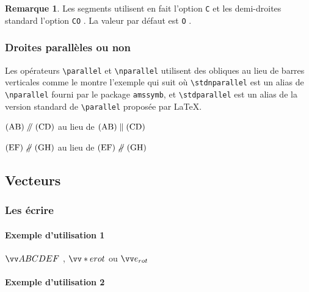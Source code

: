 \documentclass[12pt,a4paper]{article}
\newcommand\env[1]{\texttt{#1}}
\newcommand\macro[1]{\env{\textbackslash{}#1}}
\theoremstyle{definition}
\newtheorem*{remark}{Remarque}
\newcommand\prefix[1]{%
	\texttt{#1}%
}
\begin{document}
\begin{remark}
	Les segments utilisent en fait l'option \prefix{C} et les demi-droites standard l'option \prefix{CO}.
	La valeur par défaut est \prefix{O}.
\end{remark}




\subsubsection{Droites parallèles ou non}

Les opérateurs \macro{parallel} et \macro{nparallel} utilisent des obliques au lieu de barres verticales comme le montre l'exemple qui suit où \macro{stdnparallel} est un alias de \macro{nparallel} fourni par le package \verb+amssymb+, et \macro{stdparallel} est un alias de la version standard de \macro{parallel} proposée par \LaTeX{}.

\begin{latexex}
$\pgline{A}{B} \parallel \pgline{C}{D}$
au lieu de
$\pgline{A}{B}
 \stdparallel \pgline{C}{D}$

$\pgline{E}{F} \nparallel \pgline{G}{H}$
au lieu de
$\pgline{E}{F}
 \stdnparallel \pgline{G}{H}$
\end{latexex}



\subsection{Vecteurs}

\subsubsection{Les écrire}

\paragraph{Exemple d'utilisation 1}

\begin{latexex}
$\vect{ABCDEF}$  ,
$\vect*{e}{rot}$ ou
$\vect{e_{rot}}$
\end{latexex}




\paragraph{Exemple d'utilisation 2}
\end{document}
